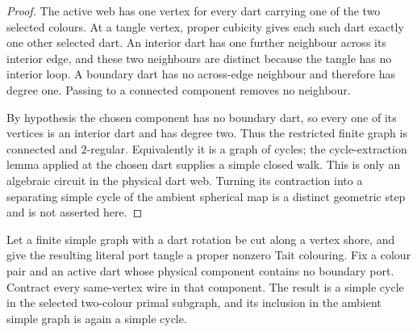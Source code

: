 \begin{proof}
The active web has one vertex for every dart carrying one of the two selected
colours.  At a tangle vertex, proper cubicity gives each such dart exactly one
other selected dart.  An interior dart has one further neighbour across its
interior edge, and these two neighbours are distinct because the tangle has
no interior loop.  A boundary dart has no across-edge neighbour and therefore
has degree one.  Passing to a connected component removes no neighbour.

By hypothesis the chosen component has no boundary dart, so every one of its
vertices is an interior dart and has degree two.  Thus the restricted finite
graph is connected and $2$-regular.  Equivalently it is a graph of cycles;
the cycle-extraction lemma applied at the chosen dart supplies a simple closed
walk.  This is only an algebraic circuit in the physical dart web.  Turning
its contraction into a separating simple cycle of the ambient spherical map
is a distinct geometric step and is not asserted here.
\end{proof}

\begin{lemma}
\label{lem:graph-backed-kempe-boundary-free-primal-cycle}
Let a finite simple graph with a dart rotation be cut along a vertex shore,
and give the resulting literal port tangle a proper nonzero Tait colouring.
Fix a colour pair and an active dart whose physical component contains no
boundary port.  Contract every same-vertex wire in that component.  The
result is a simple cycle in the selected two-colour primal subgraph, and its
inclusion in the ambient simple graph is again a simple cycle.
\end{lemma}

